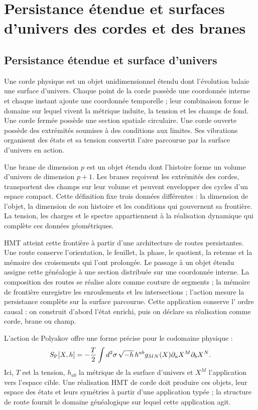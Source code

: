 \chapter{Persistance étendue et surfaces d'univers des cordes et des branes}
\label{mdp4:chap:teoria-m}

\section{Persistance étendue et surface d’univers}

Une corde physique est un objet unidimensionnel étendu dont l'évolution balaie
une surface d'univers. Chaque point de la corde possède une coordonnée interne
et chaque instant ajoute une coordonnée temporelle ; leur combinaison forme
le domaine sur lequel vivent la métrique induite, la tension et les champs de
fond. Une corde fermée possède une section spatiale circulaire. Une corde ouverte
possède des extrémités soumises à des conditions aux limites. Ses vibrations organisent
des états et sa tension convertit l'aire parcourue par la surface d'univers en
action.

Une brane de dimension \(p\) est un objet étendu dont l'histoire forme un
volume d'univers de dimension \(p+1\). Les branes reçoivent les extrémités des cordes,
transportent des champs sur leur volume et peuvent envelopper des cycles d'un espace
compact. Cette définition fixe trois données différentes : la dimension de l'objet,
la dimension de son histoire et les conditions qui gouvernent sa frontière. La
tension, les charges et le spectre appartiennent à la réalisation dynamique qui
complète ces données géométriques.

HMT atteint cette frontière à partir d'une architecture de routes persistantes. Une
route conserve l'orientation, le feuillet, la phase, le quotient, la retenue et la mémoire des
croisements qui l'ont prolongée. Le passage à un objet étendu assigne cette
généalogie à une section distribuée sur une coordonnée interne. La
composition des routes se réalise alors comme couture de segments ; la mémoire
de frontière enregistre les enroulements et les intersections ; l'action mesure la
persistance complète sur la surface parcourue. Cette application conserve l'
ordre causal : on construit d'abord l'état enrichi, puis on déclare
sa réalisation comme corde, brane ou champ.

L'action de Polyakov offre une forme précise pour le codomaine physique :
\[
 S_{\rm P}[X,h]
 =-\frac{T}{2}\int d^2\sigma\,
 \sqrt{-h}\,h^{ab}g_{MN}(X)
 \partial_aX^M\partial_bX^N.
\]
Ici, \(T\) est la tension, \(h_{ab}\) la métrique de la surface d'univers et
\(X^M\) l'application vers l'espace cible. Une réalisation HMT de corde doit
produire ces objets, leur espace des états et leurs symétries à partir d'une application
typée ; la structure de route fournit le domaine généalogique sur lequel
cette application agit.

